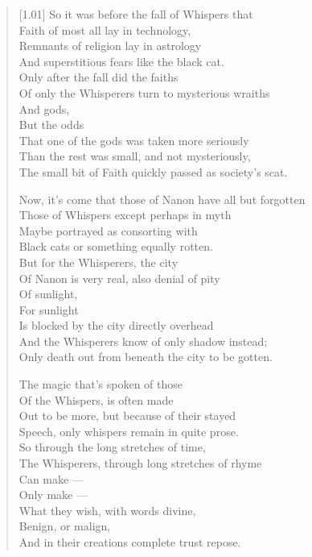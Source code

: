 \begin{paracol}{2}
\begin{leftcolumn}
\begin{verse}[1.01\textwidth]
So it was before the fall of Whispers that\\
\vin Faith of most all lay in technology,\\
\vin Remnants of religion lay in astrology\\
And superstitious fears like the black cat.\\
\vin Only after the fall did the faiths\\
\vin Of only the Whisperers turn to mysterious wraiths\\
\vin \vin And gods,\\
\vin \vin But the odds\\
\vin That one of the gods was taken more seriously\\
\vin Than the rest was small, and not mysteriously,\\
The small bit of Faith quickly passed as society's scat.\newpage

Now, it's come that those of Nanon have all but forgotten\\
\vin Those of Whispers except perhaps in myth\\
\vin Maybe portrayed as consorting with\\
Black cats or something equally rotten.\\
\vin But for the Whisperers, the city\\
\vin Of Nanon is very real, also denial of pity\\
\vin \vin Of sunlight,\\
\vin \vin For sunlight\\
\vin Is blocked by the city directly overhead\\
\vin And the Whisperers know of only shadow instead;\\
Only death out from beneath the city to be gotten.

The magic that's spoken of those\\
\vin Of the Whispers, is often made\\
\vin Out to be more, but because of their stayed\\
Speech, only whispers remain in quite prose.\\
\vin So through the long stretches of time,\\
\vin The Whisperers, through long stretches of rhyme\\
\vin \vin Can make ---\\
\vin \vin Only make ---\\
\vin What they wish, with words divine,\\
\vin Benign, or malign,\\
And in their creations complete trust repose.\newpage


\end{verse}
\end{leftcolumn}
\end{paracol}
